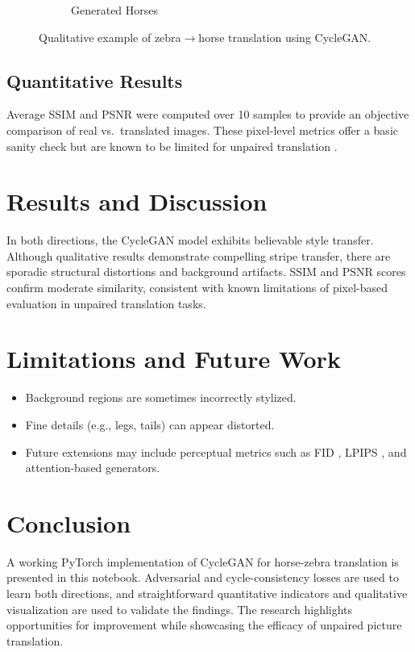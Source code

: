 \documentclass[11pt,a4paper]{article}
\begin{document}
\begin{figure}[H]
\begin{subfigure}{0.48\textwidth}
        \caption{Generated Horses}
    \end{subfigure}
    \caption{Qualitative example of zebra$\rightarrow$horse translation using CycleGAN.}
    \label{fig:z2h}
\end{figure}

\FloatBarrier

\subsection{Quantitative Results}
Average SSIM and PSNR were computed over 10 samples to provide an objective comparison of real vs.\ translated images. These pixel-level metrics offer a basic sanity check but are known to be limited for unpaired translation \cite{Wang2004SSIM}.

\section{Results and Discussion}
In both directions, the CycleGAN model exhibits believable style transfer. Although qualitative results demonstrate compelling stripe transfer, there are sporadic structural distortions and background artifacts. SSIM and PSNR scores confirm moderate similarity, consistent with known limitations of pixel-based evaluation in unpaired translation tasks.

\section{Limitations and Future Work}
\begin{itemize}[leftmargin=1.25em]
    \item Background regions are sometimes incorrectly stylized.
    \item Fine details (e.g., legs, tails) can appear distorted.
    \item Future extensions may include perceptual metrics such as FID \cite{Heusel2017FID}, LPIPS \cite{Zhang2018LPIPS}, and attention-based generators.
\end{itemize}

\section{Conclusion}
A working PyTorch implementation of CycleGAN for horse-zebra translation is presented in this notebook.  Adversarial and cycle-consistency losses are used to learn both directions, and straightforward quantitative indicators and qualitative visualization are used to validate the findings.  The research highlights opportunities for improvement while showcasing the efficacy of unpaired picture translation.



\end{document}
